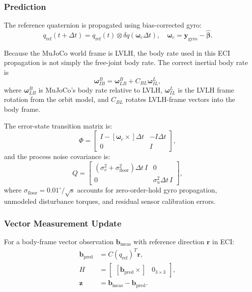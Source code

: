 \documentclass[conference]{IEEEtran}
\begin{document}
\subsubsection{Prediction}

The reference quaternion is propagated using bias-corrected gyro:
\begin{equation}
  q_{\text{ref}}(t + \Delta t) = q_{\text{ref}}(t) \otimes \delta q(\bm{\omega}_c \Delta t),
  \quad \bm{\omega}_c = \bm{y}_{\text{gyro}} - \hat{\bm{\beta}}.
\end{equation}

Because the MuJoCo world frame is LVLH, the body rate used in this ECI
propagation is not simply the free-joint body rate.  The correct inertial
body rate is
\begin{equation}
  \bm{\omega}_{IB}^B = \bm{\omega}_{LB}^B + C_{BL}\bm{\omega}_{IL}^L,
\end{equation}
where $\bm{\omega}_{LB}^B$ is MuJoCo's body rate relative to LVLH,
$\bm{\omega}_{IL}^L$ is the LVLH frame rotation from the orbit model, and
$C_{BL}$ rotates LVLH-frame vectors into the body frame.

The error-state transition matrix is:
\begin{equation}
  \Phi = \begin{bmatrix}
    I - [\bm{\omega}_c \times]\Delta t & -I\Delta t \\
    0 & I
  \end{bmatrix},
\end{equation}
and the process noise covariance is:
\begin{equation}
  Q = \begin{bmatrix}
    (\sigma_v^2 + \sigma_{\text{floor}}^2)\Delta t\, I & 0 \\
    0 & \sigma_u^2 \Delta t\, I
  \end{bmatrix},
\end{equation}
where $\sigma_{\text{floor}} = 0.01^\circ/\sqrt{\text{s}}$ accounts for
zero-order-hold gyro propagation, unmodeled disturbance torques, and residual
sensor calibration errors.

\subsubsection{Vector Measurement Update}

For a body-frame vector observation $\bm{b}_{\text{meas}}$ with reference
direction $\bm{r}$ in ECI:
\begin{align}
  \bm{b}_{\text{pred}} &= C(q_{\text{ref}})^T \bm{r}, \\
  H &= \begin{bmatrix} [\bm{b}_{\text{pred}} \times] & 0_{3\times3} \end{bmatrix}, \\
  \bm{z} &= \bm{b}_{\text{meas}} - \bm{b}_{\text{pred}}.
\end{align}
\end{document}

